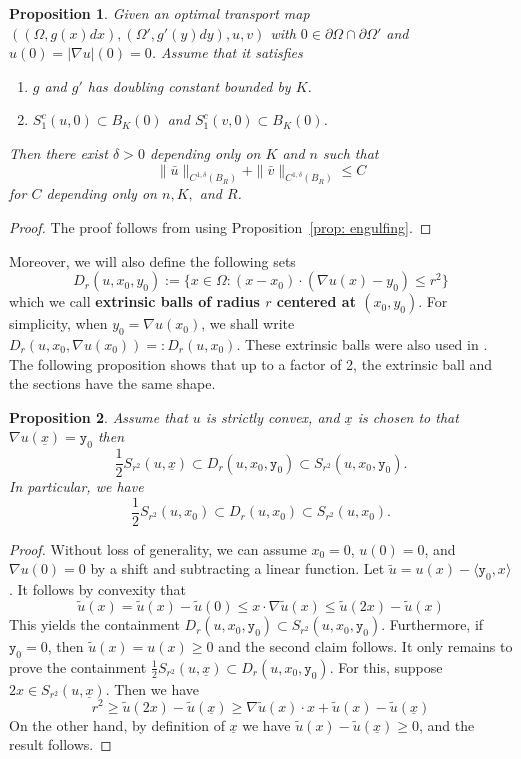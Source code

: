 \documentclass[10pt,a4paper]{amsart}
\newtheorem{prop}{Proposition}[section]
\numberwithin{equation}{section}
\begin{document}
\begin{prop}\label{prop: C1-delta-estimate}
        Given an optimal transport map $((\Omega, g(x)dx), (\Omega', g'(y)dy), u, v)$ with $0\in\partial\Omega\cap \partial\Omega'$ and $u(0) = |\nabla u|(0) = 0$. Assume that it satisfies
        \begin{enumerate}
            \item $g$ and $g'$ has doubling constant bounded by $K$.
            \item $S_1^c(u, 0)\subset B_K(0)$ and $S_1^c(v, 0)\subset B_K(0)$. 
        \end{enumerate}
        Then there exist $\delta>0$ depending only on $K$ and $n$ such that
        \[\|\bar u\|_{C^{1, \delta}(B_R)}+\|\bar v\|_{C^{1, \delta}(B_R)}\leq C \]
        for $C$ depending only on $n, K, $ and $R$. 
    \end{prop}
    \begin{proof}
        The proof follows from \cite[Proposition 2.5, Remark 2.1]{Savin-Yu} using Proposition~\ref{prop: engulfing}. 
    \end{proof}

Moreover, we will also define the following sets 
\[D_r(u, x_0,y_0) := \{x\in\Omega: (x-x_0)\cdot (\nabla u(x)-y_0)\leq r^2\}\]
which we call {\bf extrinsic balls of radius $r$ centered at $(x_0,y_0)$}.  For simplicity, when $y_0=\nabla u(x_0) $, we shall write $D_r(u, x_0,\nabla u(x_0))=: D_r(u,x_0)$.  These extrinsic balls were also used in \cite{Yuan}. 
The following proposition shows that up to a factor of 2, the extrinsic ball and the sections have the same shape. 
\begin{prop}\label{prop: comparison between sections and extrinsic ball}
Assume that $u$ is strictly convex, and $\underline{x}$ is chosen to that $\nabla u(\underline{x}) = \mathtt{y}_0$ then 
    \[\frac{1}{2}S_{r^2}(u, \underline{x})\subset D_r(u, x_0,\mathtt{y}_0)\subset S_{r^2}(u, x_0, \mathtt{y}_0).\]
    In particular, we have
    \[
    \frac{1}{2}S_{r^2}(u, x_0)\subset D_r(u, x_0)\subset S_{r^2}(u, x_0).
    \]
\end{prop}
\begin{proof}
    Without loss of generality, we can assume $x_0 = 0$, $u(0) =0$, and $\nabla u(0) = 0$ by a shift and subtracting a linear function.  Let $\tilde{u} =u(x)- \langle \mathtt{y}_0,x\rangle$. It follows by convexity that 
    \[
        \tilde{u}(x)=\tilde{u}(x)-\tilde{u}(0) \leq x\cdot \nabla\tilde{u}(x) \leq \tilde{u}(2x)- \tilde{u}(x)
        \] 
        This yields the containment $D_r(u, x_0,\mathtt{y}_0)\subset S_{r^2}(u, x_0, \mathtt{y}_0)$.  Furthermore, if $\mathtt{y}_0=0$, then $\tilde{u}(x)=u(x) \geq 0$ and the second claim follows.  It only remains to prove the containment $\frac{1}{2}S_{r^2}(u, \underline{x})\subset D_r(u, x_0,\mathtt{y}_0)$.  For this, suppose $2x\in S_{r^2}(u,\underline{x})$.  Then we have
        \[
        r^2 \geq \tilde{u}(2x) - \tilde{u}(\underline{x}) \geq \nabla \tilde{u}(x) \cdot x + \tilde{u}(x) - \tilde{u}(\underline{x})
        \]
        On the other hand, by definition of $\underline{x}$ we have $\tilde{u}(x) - \tilde{u}(\underline{x}) \geq 0$, and the result follows.
\end{proof}
\end{document}
